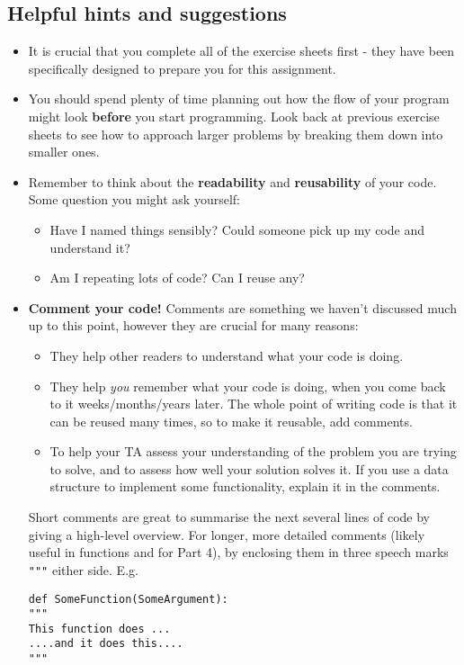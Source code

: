 \documentclass[11pt]{report}
\begin{document}
\subsection*{Helpful hints and suggestions}
\begin{itemize}
    \item It is crucial that you complete all of the exercise sheets first - they have been specifically designed to prepare you for this assignment.
	\item You should spend plenty of time planning out how the flow of your program might look \textbf{before} you start programming. Look back at previous exercise sheets to see how to approach larger problems by breaking them down into smaller ones.
	\item Remember to think about the \textbf{readability} and \textbf{reusability} of your code. Some question you might ask yourself:
	\begin{itemize}
		\item Have I named things sensibly? Could someone pick up my code and understand it?
		\item Am I repeating lots of code? Can I reuse any?
	\end{itemize}
	\item \textbf{Comment your code!} Comments are something we haven't discussed much up to this point, however they are crucial for many reasons:
	\begin{itemize}
		\item They help other readers to understand what your code is doing.
		\item They help \emph{you} remember what your code is doing, when you come back to it weeks/months/years later. The whole point of writing code is that it can be reused many times, so to make it reusable, add comments.
		\item To help your TA assess your understanding of the problem you are trying to solve, and to assess how well your solution solves it. If you use a data structure to implement some functionality, explain it in the comments.
	\end{itemize}
	Short comments are great to summarise the next several lines of code by giving a high-level overview. For longer, more detailed comments (likely useful in functions and for Part 4), by enclosing them in three speech marks {\tt """} either side. E.g.
	
	\vspace{0.5em}
	{\tt def SomeFunction(SomeArgument):}\\
	{\tt \hspace*{2em}"""}\\
	{\tt \hspace*{2em}This function does ...}\\
	{\tt \hspace*{2em}....and it does this....}\\
	{\tt \hspace*{2em}"""}
	\vspace{0.5em}
	

\end{itemize}
\end{document}

